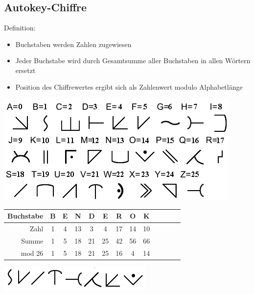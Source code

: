 \subsection{Autokey-Chiffre}

\begin{frame}
\begin{block}{Definition:}
\begin{itemize}
	\item Buchstaben werden Zahlen zugewiesen
	\item Jeder Buchstabe wird durch Gesamtsumme aller Buchstaben in allen Wörtern ersetzt
	\item Position des Chiffrewertes ergibt sich als Zahlenwert modulo Alphabetlänge
\end{itemize}
\end{block}
\end{frame}

\begin{frame}
\begin{center}
	\includegraphics[width=.5\textwidth]{autokey_chiffre.png}
\end{center}

\begin{longtable}{|r|c|c|c|c|c|c|c|c|c|c|c|c|}
\hline
Buchstabe & B & E &  N &  D &  E &  R &  O &  K\\\hline
Zahl      & 1 & 4 & 13 &  3 &  4 & 17 & 14 & 10\\\hline
Summe     & 1 & 5 & 18 & 21 & 25 & 42 & 56 & 66\\\hline
mod 26    & 1 & 5 & 18 & 21 & 25 & 16 &  4 & 14\\\hline
\end{longtable}

\begin{center}
	\includegraphics[width=.4\textwidth]{bender_ok.png}
\end{center}

\end{frame}

